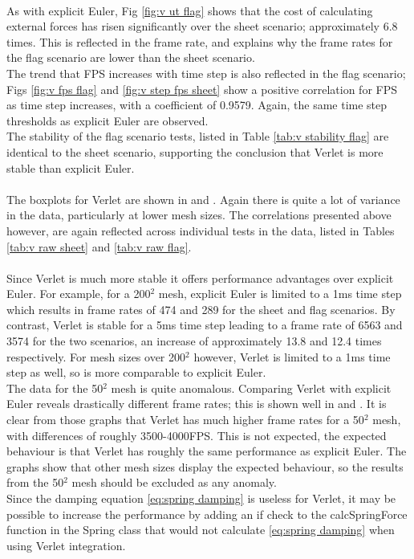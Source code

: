 \\As with explicit Euler, Fig \ref{fig:v ut flag} shows that the cost of calculating external forces has risen significantly over the sheet scenario; approximately 6.8 times. This is reflected in the frame rate, and explains why the frame rates for the flag scenario are lower than the sheet scenario.
\\The trend that FPS increases with time step is also reflected in the flag scenario; Figs \ref{fig:v fps flag} and \ref{fig:v step fps sheet} show a positive correlation for FPS as time step increases, with a coefficient of 0.9579. Again, the same time step thresholds as explicit Euler are observed.
\\The stability of the flag scenario tests, listed in Table \ref{tab:v stability flag} are identical to the sheet scenario, supporting the conclusion that Verlet is more stable than explicit Euler.
\\\\The boxplots for Verlet are shown in  and . Again there is quite a lot of variance in the data, particularly at lower mesh sizes. The correlations presented above however, are again reflected across individual tests in the data, listed in Tables \ref{tab:v raw sheet} and \ref{tab:v raw flag}.
\\\\Since Verlet is much more stable it offers performance advantages over explicit Euler. For example, for a 200$^{2}$ mesh, explicit Euler is limited to a 1ms time step which results in frame rates of 474 and 289 for the sheet and flag scenarios. By contrast, Verlet is stable for a 5ms time step leading to a frame rate of 6563 and 3574 for the two scenarios, an increase of approximately 13.8 and 12.4 times respectively. For mesh sizes over 200$^{2}$ however, Verlet is limited to a 1ms time step as well, so is more comparable to explicit Euler.
\\The data for the 50$^{2}$ mesh is quite anomalous. Comparing Verlet with explicit Euler reveals drastically different frame rates; this is shown well in  and . It is clear from those graphs that Verlet has much higher frame rates for a 50$^{2}$ mesh, with differences of roughly 3500-4000FPS. This is not expected, the expected behaviour is that Verlet has roughly the same performance as explicit Euler. The graphs show that other mesh sizes display the expected behaviour, so the results from the 50$^{2}$ mesh should be excluded as any anomaly.
\\Since the damping equation \ref{eq:spring damping} is useless for Verlet, it may be possible to increase the performance by adding an if check to the calcSpringForce function in the Spring class that would not calculate \ref{eq:spring damping} when using Verlet integration.

